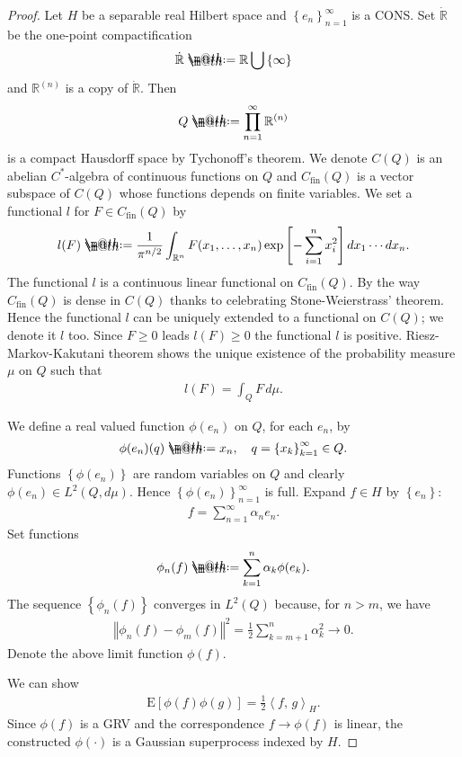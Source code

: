 \documentclass[openany, a4paper, oneside]{book}
\makeatletter
\newcommand*{\defeq}{\mathrel{\rlap{%
\raisebox{0.3ex}{$\m@th\cdot$}}%
\raisebox{-0.3ex}{$\m@th\cdot$}}%
=}
\theoremstyle{break}
\theoremstyle{breakdefn}
\newcommand{\norm}[1]{\left\Vert#1\right\Vert}
\newcommand{\sqbk}[1]{\left[#1\right]}
\newcommand{\cbk}[1]{\left\{#1\right\}}
\newcommand{\bkt}[2]{\left\langle#1,\,#2\right\rangle}
\newcommand{\bbR}{\mathbb{R}}
\newcommand{\bbRn}{\mathbb{R}^n}
\newcommand{\E}[1]{\rmE\sqbk{#1}}
\newcommand{\rmE}{\mathrm{E}}
\makeatother
\begin{document}
\begin{proof}
 Let $H$ be a separable real Hilbert space and $\cbk{e_n}_{n=1}^{\infty}$ is a CONS.
 Set $\dot{\bbR}$ be the one-point compactification
  \begin{align}
   \dot{\bbR} \defeq \bbR \bigcup \cbk{\infty}
  \end{align}
 and $\bbR^{(n)}$ is a copy of $\dot{\bbR}$.
 Then
 \begin{align}
  Q
  \defeq
  \prod_{n=1}^{\infty} \bbR^{(n)}
 \end{align}
 is a compact Hausdorff space by Tychonoff's theorem.
 We denote $C (Q)$ is an abelian $C^*$-algebra of continuous functions on $Q$
 and $C_{\mathrm{fin}} (Q)$ is a vector subspace of $C (Q)$ whose functions depends on finite variables.
 We set a functional $l$ for $F \in C_{\mathrm{fin}} (Q)$ by
 \begin{align}
  l (F)
  \defeq
  \frac{1}{\pi^{n/2}} \int_{\bbRn} F (x_1, \dots, x_n) \exp \sqbk{- \sum_{i=1}^{n} x_i^2} dx_1 \cdots dx_n.
 \end{align}
 The functional $l$ is a continuous linear functional on $C_{\mathrm{fin}} (Q)$.
 By the way $C_{\mathrm{fin}} (Q)$ is dense in $C (Q)$ thanks to celebrating Stone-Weierstrass' theorem.
 Hence the functional $l$ can be uniquely extended to a functional on $C (Q)$; we denote it $l$ too.
 Since $F \geq 0$ leads $l (F) \geq 0$ the functional $l$ is positive.
 Riesz-Markov-Kakutani theorem shows the unique existence of the probability measure $\mu$ on $Q$ such that
 \begin{align}
  l (F)
  =
  \int_Q F \, d \mu.
 \end{align}

 We define a real valued function $\phi (e_n)$ on $Q$, for each $e_n$, by
 \begin{align}
  \phi (e_n) (q) \defeq x_n, \quad q = \cbk{x_k}_{k=1}^{\infty} \in Q.
 \end{align}
 Functions $\cbk{\phi (e_n)}$ are random variables on $Q$ and clearly $\phi (e_n) \in L^2 (Q, d \mu)$.
 Hence $\cbk{\phi (e_n)}_{n=1}^{\infty}$ is full.
 Expand $f \in H$ by $\cbk{e_n}$:
 \begin{align}
  f = \sum_{n=1}^{\infty} \alpha_n e_n.
 \end{align}
 Set functions
 \begin{align}
  \phi_n (f)
  \defeq
  \sum_{k=1}^{n} \alpha_k \phi (e_k).
 \end{align}
 The sequence $\cbk{\phi_n (f)}$ converges in $L^2 (Q)$ because, for $n > m$, we have
 \begin{align}
  \norm{\phi_n (f) - \phi_m (f)}^2
  =
  \frac{1}{2} \sum_{k = m+1}^{n} \alpha_k^2
  \to 0.
 \end{align}
 Denote the above limit function $\phi (f)$.

 We can show
 \begin{align}
  \E{\phi (f) \phi (g)} = \frac{1}{2} \bkt{f}{g}_{H}.
 \end{align}
 Since $\phi (f)$ is a GRV and the correspondence $f \to \phi (f)$ is linear,
 the constructed $\phi (\cdot)$ is a Gaussian superprocess indexed by $H$.
\end{proof}
\end{document}

